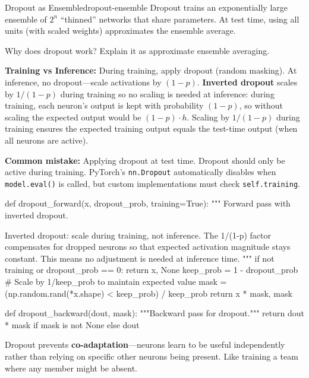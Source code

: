 \documentclass[../../main.tex]{subfiles}
\begin{document}
\begin{theorem}{Dropout as Ensemble}{dropout-ensemble}
Dropout trains an exponentially large ensemble of $2^n$ ``thinned'' networks that share parameters. At test time, using all units (with scaled weights) approximates the ensemble average.
\end{theorem}

\begin{checkpoint}
Why does dropout work? Explain it as approximate ensemble averaging.
\end{checkpoint}

\begin{important}
\textbf{Training vs Inference:} During training, apply dropout (random masking). At inference, no dropout---scale activations by $(1-p)$. \textbf{Inverted dropout} scales by $1/(1-p)$ during training so no scaling is needed at inference: during training, each neuron's output is kept with probability $(1-p)$, so without scaling the expected output would be $(1-p) \cdot h$. Scaling by $1/(1-p)$ during training ensures the expected training output equals the test-time output (when all neurons are active).

\textbf{Common mistake:} Applying dropout at test time. Dropout should only be active during training. PyTorch's \texttt{nn.Dropout} automatically disables when \texttt{model.eval()} is called, but custom implementations must check \texttt{self.training}.
\end{important}

\begin{pythoncode}
def dropout_forward(x, dropout_prob, training=True):
    """
    Forward pass with inverted dropout.

    Inverted dropout: scale during training, not inference.
    The 1/(1-p) factor compensates for dropped neurons so that
    expected activation magnitude stays constant. This means
    no adjustment is needed at inference time.
    """
    if not training or dropout_prob == 0:
        return x, None
    keep_prob = 1 - dropout_prob
    # Scale by 1/keep_prob to maintain expected value
    mask = (np.random.rand(*x.shape) < keep_prob) / keep_prob
    return x * mask, mask

def dropout_backward(dout, mask):
    """Backward pass for dropout."""
    return dout * mask if mask is not None else dout
\end{pythoncode}

\begin{intuition}
Dropout prevents \textbf{co-adaptation}---neurons learn to be useful independently rather than relying on specific other neurons being present. Like training a team where any member might be absent.
\end{intuition}
\end{document}
